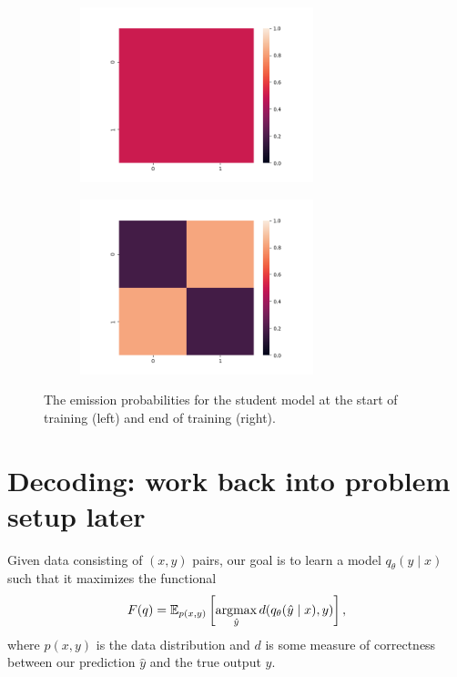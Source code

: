 \documentclass[11pt]{article}
\begin{document}
\begin{figure}[h]
\centering
\begin{subfigure}[t]{0.45\textwidth}
\centering
\includegraphics[height=2in]{../plots/student_init.png}
\end{subfigure}
\begin{subfigure}[t]{0.45\textwidth}
\centering
\includegraphics[height=2in]{../plots/student_final.png}
\end{subfigure}
\caption{
\label{fig:student-toy}
The emission probabilities for the student model at the start of training (left)
and end of training (right).
}
\end{figure}


\section*{Decoding: work back into problem setup later}
Given data consisting of $(x,y)$ pairs, our goal is to learn a model $q_\theta(y \mid x)$
such that it maximizes the functional
\begin{equation}
    \label{eqn:obj}
    F(q) = \mathbb{E}_{p(x,y)}\left[\operatorname*{argmax}_{\hat{y}}d(q_\theta(\hat{y} \mid x), y)\right],
\end{equation}
where $p(x,y)$ is the data distribution and $d$ is some measure of correctness between our
prediction $\hat{y}$ and the true output $y$.


\end{document}
